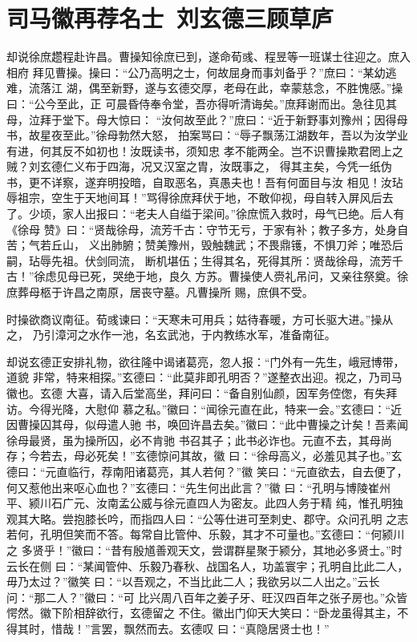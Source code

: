 \chapter{司马徽再荐名士~刘玄德三顾草庐}

却说徐庶趱程赴许昌。曹操知徐庶已到，遂命荀彧、程昱等一班谋士往迎之。庶入相府
拜见曹操。操曰：“公乃高明之士，何故屈身而事刘备乎？”庶曰：“某幼逃难，流落江
湖，偶至新野，遂与玄德交厚，老母在此，幸蒙慈念，不胜愧感。”操曰：“公今至此，正
可晨昏侍奉令堂，吾亦得听清诲矣。”庶拜谢而出。急往见其母，泣拜于堂下。母大惊曰：
“汝何故至此？”庶曰：“近于新野事刘豫州；因得母书，故星夜至此。”徐母勃然大怒，
拍案骂曰：“辱子飘荡江湖数年，吾以为汝学业有进，何其反不如初也！汝既读书，须知忠
孝不能两全。岂不识曹操欺君罔上之贼？刘玄德仁义布于四海，况又汉室之胄，汝既事之，
得其主矣，今凭一纸伪书，更不详察，遂弃明投暗，自取恶名，真愚夫也！吾有何面目与汝
相见！汝玷辱祖宗，空生于天地间耳！”骂得徐庶拜伏于地，不敢仰视，母自转入屏风后去
了。少顷，家人出报曰：“老夫人自缢于梁间。”徐庶慌入救时，母气已绝。后人有《徐母
赞》曰：“贤哉徐母，流芳千古：守节无亏，于家有补；教子多方，处身自苦；气若丘山，
义出肺腑；赞美豫州，毁触魏武；不畏鼎镬，不惧刀斧；唯恐后嗣，玷辱先祖。伏剑同流，
断机堪伍；生得其名，死得其所：贤哉徐母，流芳千古！”徐虑见母已死，哭绝于地，良久
方苏。曹操使人赍礼吊问，又亲往祭奠。徐庶葬母柩于许昌之南原，居丧守墓。凡曹操所
赐，庶俱不受。

时操欲商议南征。荀彧谏曰：“天寒未可用兵；姑待春暖，方可长驱大进。”操从之，
乃引漳河之水作一池，名玄武池，于内教练水军，准备南征。

却说玄德正安排礼物，欲往隆中谒诸葛亮，忽人报：“门外有一先生，峨冠博带，道貌
非常，特来相探。”玄德曰：“此莫非即孔明否？”遂整衣出迎。视之，乃司马徽也。玄德
大喜，请入后堂高坐，拜问曰：“备自别仙颜，因军务倥偬，有失拜访。今得光降，大慰仰
慕之私。”徽曰：“闻徐元直在此，特来一会。”玄德曰：“近因曹操囚其母，似母遣人驰
书，唤回许昌去矣。”徽曰：“此中曹操之计矣！吾素闻徐母最贤，虽为操所囚，必不肯驰
书召其子；此书必诈也。元直不去，其母尚存；今若去，母必死矣！”玄德惊问其故，徽
曰：“徐母高义，必羞见其子也。”玄德曰：“元直临行，荐南阳诸葛亮，其人若何？”徽
笑曰：“元直欲去，自去便了，何又惹他出来呕心血也？”玄德曰：“先生何出此言？”徽
曰：“孔明与博陵崔州平、颍川石广元、汝南孟公威与徐元直四人为密友。此四人务于精
纯，惟孔明独观其大略。尝抱膝长吟，而指四人曰：“公等仕进可至刺史、郡守。众问孔明
之志若何，孔明但笑而不答。每常自比管仲、乐毅，其才不可量也。”玄德曰：“何颍川之
多贤乎！”徽曰：“昔有殷馗善观天文，尝谓群星聚于颍分，其地必多贤士。”时云长在侧
曰：“某闻管仲、乐毅乃春秋、战国名人，功盖寰宇；孔明自比此二人，毋乃太过？”徽笑
曰：“以吾观之，不当比此二人；我欲另以二人出之。”云长问：“那二人？”徽曰：“可
比兴周八百年之姜子牙、旺汉四百年之张子房也。”众皆愕然。徽下阶相辞欲行，玄德留之
不住。徽出门仰天大笑曰：“卧龙虽得其主，不得其时，惜哉！”言罢，飘然而去。玄德叹
曰：“真隐居贤士也！”

